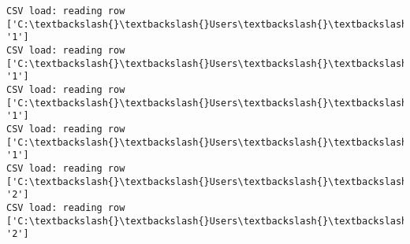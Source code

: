 \documentclass[11pt]{article}
\begin{document}
\begin{Verbatim}[commandchars=\\\{\}]
CSV load: reading row ['C:\textbackslash{}\textbackslash{}Users\textbackslash{}\textbackslash{}AbhishekGangadhar\textbackslash{}\textbackslash{}Downloads\textbackslash{}\textbackslash{}ActionRecog\textbackslash{}\textbackslash{}ActionRecog\textbackslash{}\textbackslash{}DataSets\textbackslash{}\textbackslash{}UCF11\textbackslash{}\textbackslash{}action\_youtube\_naudio\textbackslash{}\textbackslash{}golf\_swing\textbackslash{}\textbackslash{}v\_golf\_08\textbackslash{}\textbackslash{}v\_golf\_08\_03.avi', '1']
CSV load: reading row ['C:\textbackslash{}\textbackslash{}Users\textbackslash{}\textbackslash{}AbhishekGangadhar\textbackslash{}\textbackslash{}Downloads\textbackslash{}\textbackslash{}ActionRecog\textbackslash{}\textbackslash{}ActionRecog\textbackslash{}\textbackslash{}DataSets\textbackslash{}\textbackslash{}UCF11\textbackslash{}\textbackslash{}action\_youtube\_naudio\textbackslash{}\textbackslash{}golf\_swing\textbackslash{}\textbackslash{}v\_golf\_08\textbackslash{}\textbackslash{}v\_golf\_08\_04.avi', '1']
CSV load: reading row ['C:\textbackslash{}\textbackslash{}Users\textbackslash{}\textbackslash{}AbhishekGangadhar\textbackslash{}\textbackslash{}Downloads\textbackslash{}\textbackslash{}ActionRecog\textbackslash{}\textbackslash{}ActionRecog\textbackslash{}\textbackslash{}DataSets\textbackslash{}\textbackslash{}UCF11\textbackslash{}\textbackslash{}action\_youtube\_naudio\textbackslash{}\textbackslash{}golf\_swing\textbackslash{}\textbackslash{}v\_golf\_08\textbackslash{}\textbackslash{}v\_golf\_08\_05.avi', '1']
CSV load: reading row ['C:\textbackslash{}\textbackslash{}Users\textbackslash{}\textbackslash{}AbhishekGangadhar\textbackslash{}\textbackslash{}Downloads\textbackslash{}\textbackslash{}ActionRecog\textbackslash{}\textbackslash{}ActionRecog\textbackslash{}\textbackslash{}DataSets\textbackslash{}\textbackslash{}UCF11\textbackslash{}\textbackslash{}action\_youtube\_naudio\textbackslash{}\textbackslash{}golf\_swing\textbackslash{}\textbackslash{}v\_golf\_08\textbackslash{}\textbackslash{}v\_golf\_08\_06.avi', '1']
CSV load: reading row ['C:\textbackslash{}\textbackslash{}Users\textbackslash{}\textbackslash{}AbhishekGangadhar\textbackslash{}\textbackslash{}Downloads\textbackslash{}\textbackslash{}ActionRecog\textbackslash{}\textbackslash{}ActionRecog\textbackslash{}\textbackslash{}DataSets\textbackslash{}\textbackslash{}UCF11\textbackslash{}\textbackslash{}action\_youtube\_naudio\textbackslash{}\textbackslash{}trampoline\_jumping\textbackslash{}\textbackslash{}v\_jumping\_23\textbackslash{}\textbackslash{}v\_jumping\_23\_01.avi', '2']
CSV load: reading row ['C:\textbackslash{}\textbackslash{}Users\textbackslash{}\textbackslash{}AbhishekGangadhar\textbackslash{}\textbackslash{}Downloads\textbackslash{}\textbackslash{}ActionRecog\textbackslash{}\textbackslash{}ActionRecog\textbackslash{}\textbackslash{}DataSets\textbackslash{}\textbackslash{}UCF11\textbackslash{}\textbackslash{}action\_youtube\_naudio\textbackslash{}\textbackslash{}trampoline\_jumping\textbackslash{}\textbackslash{}v\_jumping\_23\textbackslash{}\textbackslash{}v\_jumping\_23\_02.avi', '2']

\end{Verbatim}
\end{document}
